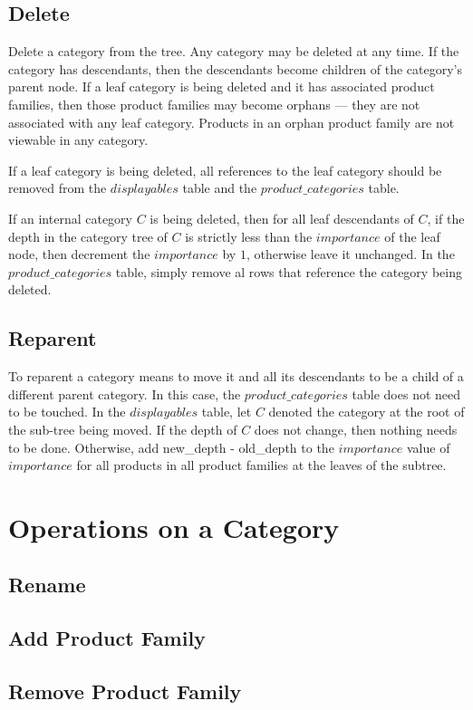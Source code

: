 \documentclass[letterpaper, 12pt]{article}
\begin{document}
\subsection{Delete}
Delete a category from the tree. Any category may be deleted at any time.  If the category has descendants, then the descendants become children of the category's parent node.  If a leaf category is being deleted and it has associated product families, then those product families may become orphans --- they are not associated with any leaf category.  Products in an orphan product family are not viewable in any category.
\par
If a leaf category is being deleted, all references to the leaf category should be removed from the $displayables$ table and the $product\_categories$ table.
\par
If an internal category $C$ is being deleted, then for all leaf descendants of $C$, if the depth in the category tree of $C$ is strictly less than the $importance$ of the leaf node, then decrement the $importance$ by $1$, otherwise leave it unchanged.  In the $product\_categories$ table, simply remove al rows that reference the category being deleted.

\subsection{Reparent}
To reparent a category means to move it and all its descendants to be a child of a different parent category.  In this case, the $product\_categories$ table does not need to be touched.  In the $displayables$ table, let $C$ denoted the category at the root of the sub-tree being moved.  If the depth of $C$ does not change, then nothing needs to be done.  Otherwise, add new\_depth - old\_depth to the $importance$ value of $importance$ for all products in all product families at the leaves of the subtree.

\section{Operations on a Category}
\subsection{Rename}
\subsection{Add Product Family}
\subsection{Remove Product Family}
\end{document}
